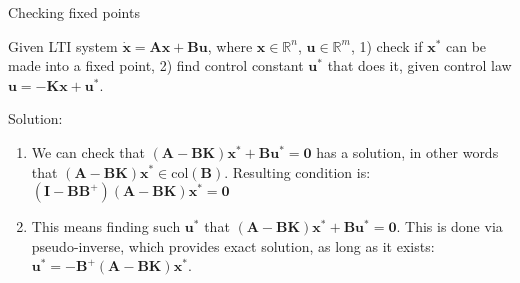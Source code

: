 \documentclass{beamer}
\begin{document}
\begin{frame}{Checking fixed points}
\begin{flushleft}

Given LTI system $\dot{\mathbf{x}} = \mathbf{A} \mathbf{x} + \mathbf{B} \mathbf{u}$, where $\mathbf{x} \in \mathbb{R}^n$, $\mathbf{u} \in \mathbb{R}^m$, 1) check if $\mathbf{x}^*$ can be made into a fixed point, 2) find control constant $\mathbf{u}^*$ that does it, given control law $\mathbf{u} = -\mathbf{K}\mathbf{x} + \mathbf{u}^*$.

\bigskip

Solution: 

\begin{enumerate}
    \item We can check that $(\mathbf{A}-\mathbf{B}\mathbf{K}) \mathbf{x}^* + \mathbf{B} \mathbf{u}^* = \mathbf{0}$ has a solution, in other words that $(\mathbf{A}-\mathbf{B}\mathbf{K}) \mathbf{x}^* \in \text{col}(\mathbf{B})$. Resulting condition is: $(\mathbf{I} - \mathbf{B}\mathbf{B}^+)(\mathbf{A}-\mathbf{B}\mathbf{K})\mathbf{x}^* = \mathbf{0}$
    \item This means finding such $\mathbf{u}^*$ that $(\mathbf{A}-\mathbf{B}\mathbf{K}) \mathbf{x}^* + \mathbf{B}\mathbf{u}^*= \mathbf{0}$. This is done via pseudo-inverse, which provides exact solution, as long as it exists: $\mathbf{u}^*= -\mathbf{B}^+(\mathbf{A}-\mathbf{B}\mathbf{K}) \mathbf{x}^*$.
\end{enumerate}

\end{flushleft}
\end{frame}
\end{document}
